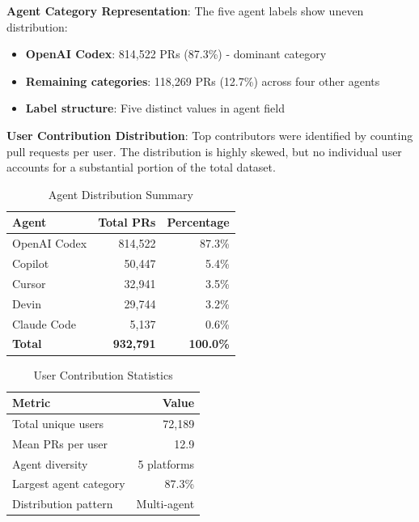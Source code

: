 \documentclass[conference]{IEEEtran}
\begin{document}
\textbf{Agent Category Representation}: The five agent labels show uneven distribution:
\begin{itemize}
    \item \textbf{OpenAI Codex}: 814,522 PRs (87.3\%) - dominant category
    \item \textbf{Remaining categories}: 118,269 PRs (12.7\%) across four other agents
    \item \textbf{Label structure}: Five distinct values in agent field
\end{itemize}

\textbf{User Contribution Distribution}: Top contributors were identified by counting pull requests per user. The distribution is highly skewed, but no individual user accounts for a substantial portion of the total dataset.

\begin{table}[t]
\centering
\caption{Agent Distribution Summary}
\label{tab:agent_distribution}
\begin{tabular}{@{}lrr@{}}
\toprule
\textbf{Agent} & \textbf{Total PRs} & \textbf{Percentage} \\
\midrule
OpenAI Codex & 814,522 & 87.3\% \\
Copilot & 50,447 & 5.4\% \\
Cursor & 32,941 & 3.5\% \\
Devin & 29,744 & 3.2\% \\
Claude Code & 5,137 & 0.6\% \\
\midrule
\textbf{Total} & \textbf{932,791} & \textbf{100.0\%} \\
\bottomrule
\end{tabular}
\end{table}

\begin{table}[t]
\centering
\caption{User Contribution Statistics}
\label{tab:user_stats}
\begin{tabular}{@{}lr@{}}
\toprule
\textbf{Metric} & \textbf{Value} \\
\midrule
Total unique users & 72,189 \\
Mean PRs per user & 12.9 \\
Agent diversity & 5 platforms \\
Largest agent category & 87.3\% \\
Distribution pattern & Multi-agent \\
\bottomrule
\end{tabular}
\end{table}
\end{document}

